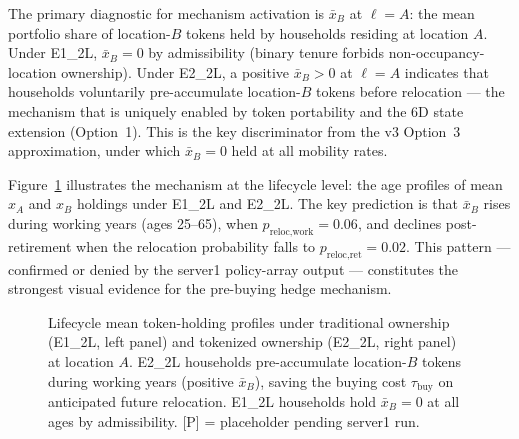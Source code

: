The primary diagnostic for mechanism activation is $\bar{x}_B$ at $\ell{=}A$:
the mean portfolio share of location-$B$ tokens held by households residing
at location $A$.
Under E1\_2L, $\bar{x}_B = 0$ by admissibility (binary tenure forbids
non-occupancy-location ownership).
Under E2\_2L, a positive $\bar{x}_B > 0$ at $\ell{=}A$ indicates that
households voluntarily pre-accumulate location-$B$ tokens before relocation ---
the mechanism that is uniquely enabled by token portability and the 6D state
extension (Option~1).
This is the key discriminator from the v3 Option~3 approximation, under which
$\bar{x}_B = 0$ held at all mobility rates.

Figure~\ref{fig:lifecycle_profiles} illustrates the mechanism at the
lifecycle level: the age profiles of mean $x_A$ and $x_B$ holdings
under E1\_2L and E2\_2L.
The key prediction is that $\bar{x}_B$ rises during working years (ages 25--65),
when $p_{\text{reloc,work}} = 0.06$, and declines post-retirement when the
relocation probability falls to $p_{\text{reloc,ret}} = 0.02$.
This pattern --- confirmed or denied by the server1 policy-array output ---
constitutes the strongest visual evidence for the pre-buying hedge mechanism.

\begin{figure}[t]
\centering
\caption{Lifecycle mean token-holding profiles under traditional ownership (E1\_2L,
         left panel) and tokenized ownership (E2\_2L, right panel) at location $A$.
         E2\_2L households pre-accumulate location-$B$ tokens during working years
         (positive $\bar{x}_B$), saving the buying cost $\tau_{\text{buy}}$ on
         anticipated future relocation.
         E1\_2L households hold $\bar{x}_B = 0$ at all ages by admissibility.
         \textsc{[P]} = placeholder pending server1 run.}
\label{fig:lifecycle_profiles}
\end{figure}

